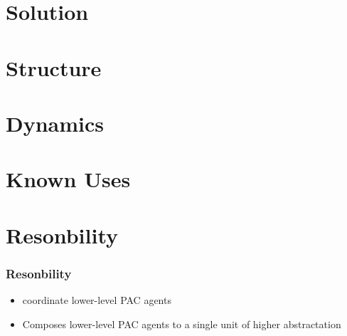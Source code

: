 \documentclass{beamer}
\begin{document}
\section{Solution}

\section{Structure}

\section{Dynamics}

\section{Known Uses}


\section{Resonbility}

\begin{frame}
 \frametitle{Resonbility}
 
 \begin{itemize}
  \item coordinate lower-level PAC agents
  \item Composes lower-level PAC agents to a single unit of higher abstractation
 \end{itemize}

\end{frame}
\end{document}

